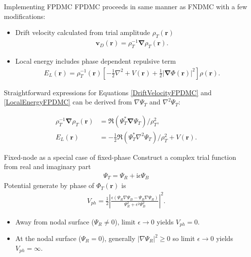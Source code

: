 \documentclass{beamer}
\begin{document}
  \begin{frame}{Implementing FPDMC}
    FPDMC proceeds in same manner as FNDMC with a few modifications:
    \begin{itemize}
      \item{ Drift velocity calculated from trial amplitude $\rho_T(\mathbf{r})$
                \small{\begin{align}
                  \label{DriftVelocityFPDMC}
                  \mathbf{v}_{D}(\mathbf{r}) = \rho_T^{-1} \mathbf{\nabla} \rho_T(\mathbf{r}).
                \end{align}
               }}
      \item{Local energy includes phase dependent repulsive term
                \small{\begin{align}
                  \label{LocalEnergyFPDMC}
                E_{L}(\mathbf{r}) =  \rho_T^{-1}(\mathbf{r}) \left[ -\frac{1}{2} \nabla^2 + V(\mathbf{r})  + \frac{1}{2} | \mathbf{\nabla} \Phi \left(\mathbf{r} \right) |^2 \right] \rho \left(\mathbf{r}  \right).
               \end{align}
               }}
     \end{itemize}
     Straightforward expressions for Equations \ref{DriftVelocityFPDMC} and \ref{LocalEnergyFPDMC} can be derived from $\nabla \Psi_T$ and $\nabla^2 \Psi_T$:
     \begin{center}
               \vspace{-1.em}
               \small{\begin{align}
                  \rho_T^{-1} \mathbf{\nabla} \rho_T(\mathbf{r}) &= \Re\left( \Psi_T^* \mathbf{\nabla} \Psi_T \right) / \rho_T^2, \\
                   E_{L}(\mathbf{r}) &= - \frac{1}{2}\Re\left( \Psi_T^* \nabla^2 \Psi_T \right) / \rho_T^2 + V(\mathbf{r}).
                \end{align}}
     \end{center}
  \end{frame}
  
  \begin{frame}{Fixed-node as a special case of fixed-phase}
  Construct a complex trial function from real and imaginary part
  \begin{align}
    \Psi_T = \Psi_{R} + \mathrm{i} \epsilon \Psi_{B}
  \end{align}
  Potential generate by phase of $\Phi_T (\mathbf{r})$ is 
  \begin{align}
    V_{ph} = \frac{1}{2} \left| \frac{\epsilon \left( \Psi_R \nabla \Psi_B - \Psi_B \nabla \Psi_R \right)}{\Psi_R^2 + \epsilon^2 \Psi_B^2} \right|^2.
  \end{align}
  \begin{itemize}
  \item Away from nodal surface ($\Psi_R \neq 0$), limit $\epsilon \rightarrow 0$ yields $V_{ph} =0$.
  \item At the nodal surface ($\Psi_R = 0$), generally $\left| \nabla \Psi_R \right|^2 \geq 0$ so limit $\epsilon \rightarrow 0$ yields $V_{ph} = \infty$.
  \end{itemize}
\end{frame}
\end{document}
